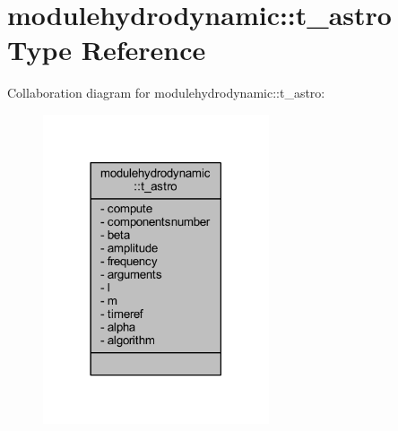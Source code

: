 \hypertarget{structmodulehydrodynamic_1_1t__astro}{}\section{modulehydrodynamic\+:\+:t\+\_\+astro Type Reference}
\label{structmodulehydrodynamic_1_1t__astro}


Collaboration diagram for modulehydrodynamic\+:\+:t\+\_\+astro\+:\nopagebreak
\begin{figure}[H]
\begin{center}
\leavevmode
\includegraphics[width=189pt]{structmodulehydrodynamic_1_1t__astro__coll__graph}
\end{center}
\end{figure}
